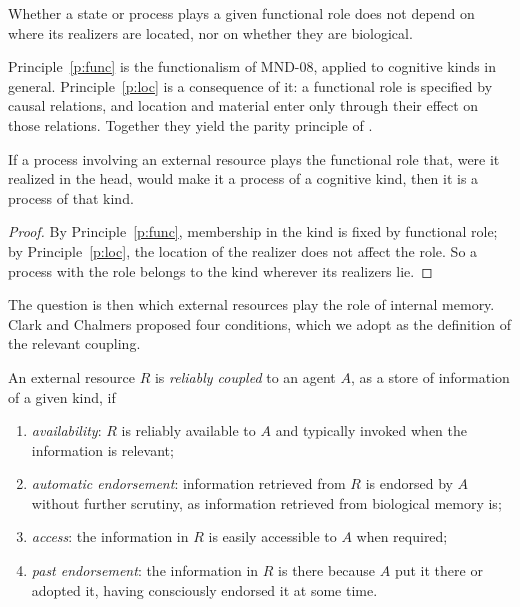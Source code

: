 \documentclass{situationist-preprint}
\begin{document}
\begin{principle}\label{p:loc}
Whether a state or process plays a given functional role does not depend on where its realizers are located, nor on whether they are biological.
\end{principle}

Principle~\ref{p:func} is the functionalism of MND-08, applied to cognitive kinds in general. Principle~\ref{p:loc} is a consequence of it: a functional role is specified by causal relations, and location and material enter only through their effect on those relations. Together they yield the parity principle of \citet{ClarkChalmers1998}.

\begin{lemma}[Parity]\label{l:parity}
If a process involving an external resource plays the functional role that, were it realized in the head, would make it a process of a cognitive kind, then it is a process of that kind.
\end{lemma}

\begin{proof}
By Principle~\ref{p:func}, membership in the kind is fixed by functional role; by Principle~\ref{p:loc}, the location of the realizer does not affect the role. So a process with the role belongs to the kind wherever its realizers lie.
\end{proof}

The question is then which external resources play the role of internal memory. Clark and Chalmers proposed four conditions, which we adopt as the definition of the relevant coupling.

\begin{definition}\label{d:coupling}
An external resource $R$ is \emph{reliably coupled} to an agent $A$, as a store of information of a given kind, if
\begin{enumerate}[label=(\alph*)]
\item \emph{availability}: $R$ is reliably available to $A$ and typically invoked when the information is relevant;
\item \emph{automatic endorsement}: information retrieved from $R$ is endorsed by $A$ without further scrutiny, as information retrieved from biological memory is;
\item \emph{access}: the information in $R$ is easily accessible to $A$ when required;
\item \emph{past endorsement}: the information in $R$ is there because $A$ put it there or adopted it, having consciously endorsed it at some time.
\end{enumerate}
\end{definition}
\end{document}

